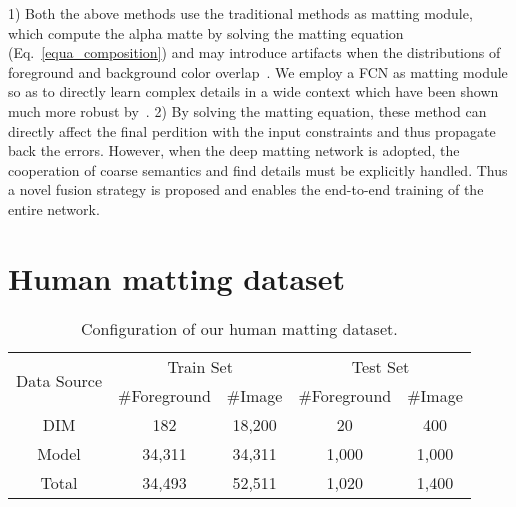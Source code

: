1) Both the above methods use the traditional methods as matting module, which compute the alpha matte by solving the matting equation (Eq.~\ref{equa_composition}) and may introduce artifacts when the distributions of foreground and background color overlap~\cite{xu2017deep}.
We employ a FCN as matting module so as to directly learn complex details in a wide context which have been shown much more robust by~\cite{xu2017deep}.
2) By solving the matting equation, these method can directly affect the final perdition with the input constraints and thus propagate back the errors.
However, when the deep matting network is adopted, the cooperation of coarse semantics and find details must be explicitly handled.
Thus a novel fusion strategy is proposed and enables the end-to-end training of the entire network.




























\section{Human matting dataset}\label{dataset}


\begin{table}[t]
\caption{Configuration of our human matting dataset.}
\centering
\begin{tabular}{c cc cc}
\toprule
   \multirow{2}{*}{Data Source}  & \multicolumn{2}{c}{Train Set}  & \multicolumn{2}{c}{Test Set} \\
             &   $\#$Foreground         & $\#$Image  &   $\#$Foreground    & $\#$Image \\ \midrule
   DIM\cite{xu2017deep} &  182        & 18,200      &   20    & 400   \\
   Model                &  34,311      & 34,311      &   1,000  & 1,000  \\
   Total                &  34,493      & 52,511      &   1,020  & 1,400  \\ \bottomrule

\end{tabular}
\label{tab:dataset_config}
\end{table}





